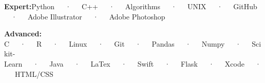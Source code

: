 \begin{cvletter}
\medskip
\begin{cvitems}
\item{\textbf{Expert:}\space\space Python~~~·~~~C++~~~·~~~Algorithms~~~·~~~UNIX~~~·~~~GitHub~~~·~~~Adobe Illustrator~~~·~~~Adobe Photoshop}
\item{\textbf{Advanced:}\space\space
C~~~·~~~R~~~·~~~Linux~~~·~~~Git~~~·~~~Pandas~~~·~~~Numpy~~~·~~~Scikit-Learn~~~·~~~Java~~~·~~~LaTex~~~·~~~Swift~~~·~~~Flask~~~·~~~Xcode~~~·~~~HTML/CSS
}
\end{cvitems}
\end{cvletter}